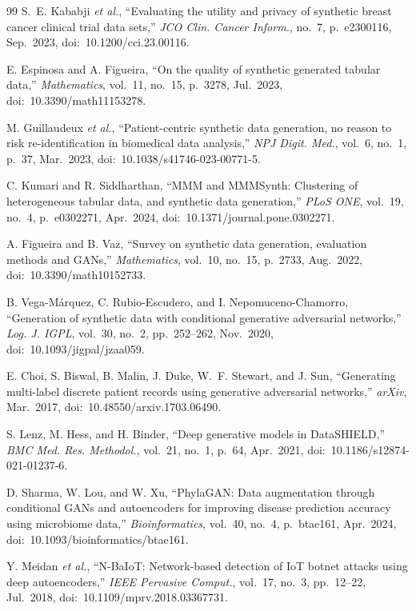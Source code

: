 \documentclass[journal]{IEEEtran}
\begin{document}
\begin{thebibliography}{99}
S.~E. Kababji \textit{et al.}, ``Evaluating the utility and privacy of synthetic breast cancer clinical trial data sets,'' \textit{JCO Clin. Cancer Inform.}, no.~7, p.~e2300116, Sep.~2023, doi:~10.1200/cci.23.00116.

E. Espinosa and A. Figueira, ``On the quality of synthetic generated tabular data,'' \textit{Mathematics}, vol.~11, no.~15, p.~3278, Jul.~2023, doi:~10.3390/math11153278.

M. Guillaudeux \textit{et al.}, ``Patient-centric synthetic data generation, no reason to risk re-identification in biomedical data analysis,'' \textit{NPJ Digit. Med.}, vol.~6, no.~1, p.~37, Mar.~2023, doi:~10.1038/s41746-023-00771-5.

C. Kumari and R. Siddharthan, ``MMM and MMMSynth: Clustering of heterogeneous tabular data, and synthetic data generation,'' \textit{PLoS ONE}, vol.~19, no.~4, p.~e0302271, Apr.~2024, doi:~10.1371/journal.pone.0302271.

A. Figueira and B. Vaz, ``Survey on synthetic data generation, evaluation methods and GANs,'' \textit{Mathematics}, vol.~10, no.~15, p.~2733, Aug.~2022, doi:~10.3390/math10152733.

B. Vega-M\'{a}rquez, C. Rubio-Escudero, and I. Nepomuceno-Chamorro, ``Generation of synthetic data with conditional generative adversarial networks,'' \textit{Log. J. IGPL}, vol.~30, no.~2, pp.~252--262, Nov.~2020, doi:~10.1093/jigpal/jzaa059.

E. Choi, S. Biswal, B. Malin, J. Duke, W.~F. Stewart, and J. Sun, ``Generating multi-label discrete patient records using generative adversarial networks,'' \textit{arXiv}, Mar.~2017, doi:~10.48550/arxiv.1703.06490.

S. Lenz, M. Hess, and H. Binder, ``Deep generative models in DataSHIELD,'' \textit{BMC Med. Res. Methodol.}, vol.~21, no.~1, p.~64, Apr.~2021, doi:~10.1186/s12874-021-01237-6.

D. Sharma, W. Lou, and W. Xu, ``PhylaGAN: Data augmentation through conditional GANs and autoencoders for improving disease prediction accuracy using microbiome data,'' \textit{Bioinformatics}, vol.~40, no.~4, p.~btae161, Apr.~2024, doi:~10.1093/bioinformatics/btae161.

Y. Meidan \textit{et al.}, ``N-BaIoT: Network-based detection of IoT botnet attacks using deep autoencoders,'' \textit{IEEE Pervasive Comput.}, vol.~17, no.~3, pp.~12--22, Jul.~2018, doi:~10.1109/mprv.2018.03367731.


\end{thebibliography}
\end{document}
